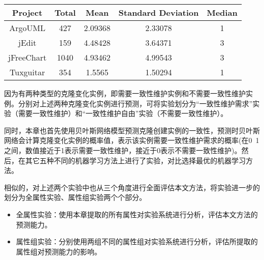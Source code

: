 \begin{table}[htbp]
\vspace{0.5em}\centering\wuhao
\begin{tabular}{ccccc}
\toprule[1.5pt]
\textbf{Project}&\textbf{Total}&\textbf{Mean}&\textbf{Standard Deviation}&\textbf{Median}\\ \hline
\midrule[1pt]
ArgoUML&427&2.09368&2.33078&1\\ \hline
jEdit&159&4.48428&3.64371&3\\ \hline	
jFreeChart&1040&4.93462&4.99543&3\\ \hline	
Tuxguitar&354&1.5565&1.50294&1\\ \hline	
\bottomrule[1.5pt]
\end{tabular}
\end{table}

因为有两种类型的克隆变化实例，即需要一致性维护实例和不需要一致性维护实例。分别对上述两种克隆变化实例进行预测，可将实验划分为“一致性维护需求”实验（需要一致性维护）和“一致性维护自由”实验（不需要一致性维护）。

同时，本章也首先使用贝叶斯网络模型预测克隆创建实例的一致性，预测时贝叶斯网络会计算克隆变化实例的概率值，表示该实例需要一致性维护需求的概率(在0~1之间，数值接近于1表示需要一致性维护，接近于0表示不需要一致性维护)。然后，在其它五种不同的机器学习方法上进行了实验，对比选择最优的机器学习方法。

相似的，对上述两个实验中也从三个角度进行全面评估本文方法，将实验进一步的划分为全属性实验、属性组实验两个个部分。
\begin{itemize}
\item
全属性实验：使用本章提取的所有属性对实验系统进行分析，评估本文方法的预测能力。
\item
属性组实验：分别使用两组不同的属性组对实验系统进行分析，评估所提取的属性组对预测能力的影响。
\end{itemize}



